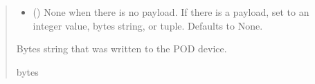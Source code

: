 \documentclass[letterpaper,10pt,english]{sphinxmanual}
\begin{document}
\begin{fulllineitems}
\begin{fulllineitems}
\begin{quote}
\begin{description}
\begin{itemize}
\item {} 
\sphinxAtStartPar
{} (\sphinxstyleliteralemphasis{\sphinxupquote{ | }}\sphinxstyleliteralemphasis{\sphinxupquote{ | }}\sphinxstyleliteralemphasis{\sphinxupquote{{[}}}\sphinxstyleliteralemphasis{\sphinxupquote{ | }}\sphinxstyleliteralemphasis{\sphinxupquote{{]}}}\sphinxstyleliteralemphasis{\sphinxupquote{, }}) \textendash{} None when there is no payload. If there                 is a payload, set to an integer value, bytes string, or tuple. Defaults to None.

\end{itemize}

\sphinxAtStartPar
Bytes string that was written to the POD device.

\sphinxAtStartPar
bytes

\end{description}\end{quote}

\end{fulllineitems}



\end{fulllineitems}
\end{document}
